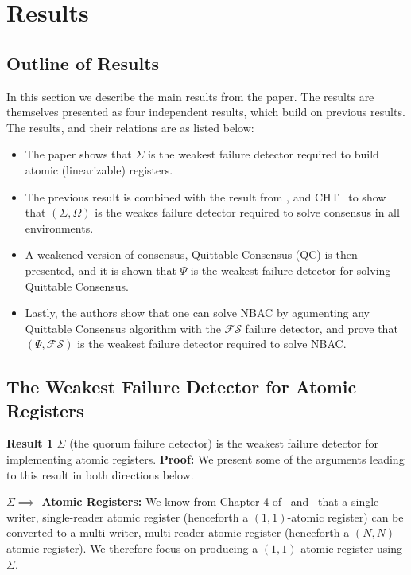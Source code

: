 \section{Results}
\subsection{Outline of Results}
In this section we describe the main results from the paper. The results are themselves presented as four independent
results, which build on previous results. The results, and their relations are as listed below:
\begin{itemize}
\item The paper shows that $\Sigma$ is the weakest failure detector required to build atomic (linearizable) registers.
\item The previous result is combined with the result from \cite{lo1994using}, and CHT~\cite{chandra1996weakest} to show
that $(\Sigma, \Omega)$ is the weakes failure detector required to solve consensus in all environments.
\item A weakened version of consensus, Quittable Consensus (QC) is then presented, and it is shown that $\Psi$ is the weakest
failure detector for solving Quittable Consensus.
\item Lastly, the  authors show that one can solve NBAC by agumenting any Quittable Consensus algorithm with the
$\mathcal{FS}$ failure detector, and prove that $(\Psi, \mathcal{FS})$ is the weakest failure detector required to solve
NBAC.
\end{itemize}

\subsection{The Weakest Failure Detector for Atomic Registers}
\textbf{Result 1} $\Sigma$ (the quorum failure detector) is the weakest failure detector for implementing atomic
registers.
\textbf{Proof:} We present some of the arguments leading to this result in both directions below.

\textbf{$\Sigma \implies$ Atomic Registers:} We know from Chapter 4 of~\cite{cachin2011introduction}
and~\cite{vitanyi1986atomic} that a single-writer, single-reader atomic register (henceforth a $(1,1)$-atomic register)
can be converted to a multi-writer, multi-reader atomic register (henceforth a $(N, N)$-atomic register). We therefore
focus on producing a $(1, 1)$ atomic register using $\Sigma$. 

